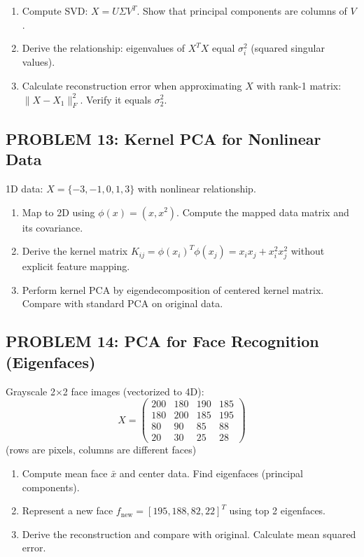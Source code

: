 \documentclass[12pt]{article}
\begin{document}
\begin{enumerate}
\item[(a)] Compute SVD: \(X = U\Sigma V^T\). Show that principal components are columns of \(V\).
\item[(b)] Derive the relationship: eigenvalues of \(X^TX\) equal \(\sigma_i^2\) (squared singular values).
\item[(c)] Calculate reconstruction error when approximating \(X\) with rank-1 matrix: \(\|X - X_1\|_F^2\). Verify it equals \(\sigma_2^2\).
\end{enumerate}

\subsection*{PROBLEM 13: Kernel PCA for Nonlinear Data}

1D data: \(X = \{-3, -1, 0, 1, 3\}\) with nonlinear relationship.

\begin{enumerate}
\item[(a)] Map to 2D using \(\phi(x) = (x, x^2)\). Compute the mapped data matrix and its covariance.
\item[(b)] Derive the kernel matrix \(K_{ij} = \phi(x_i)^T\phi(x_j) = x_ix_j + x_i^2x_j^2\) without explicit feature mapping.
\item[(c)] Perform kernel PCA by eigendecomposition of centered kernel matrix. Compare with standard PCA on original data.
\end{enumerate}

\subsection*{PROBLEM 14: PCA for Face Recognition (Eigenfaces)}

Grayscale 2×2 face images (vectorized to 4D):
\[
X = \begin{pmatrix}
200 & 180 & 190 & 185 \\
180 & 200 & 185 & 195 \\
80 & 90 & 85 & 88 \\
20 & 30 & 25 & 28
\end{pmatrix}
\]
(rows are pixels, columns are different faces)

\begin{enumerate}
\item[(a)] Compute mean face \(\bar{x}\) and center data. Find eigenfaces (principal components).
\item[(b)] Represent a new face \(f_{\text{new}} = [195, 188, 82, 22]^T\) using top 2 eigenfaces.
\item[(c)] Derive the reconstruction and compare with original. Calculate mean squared error.
\end{enumerate}
\end{document}
